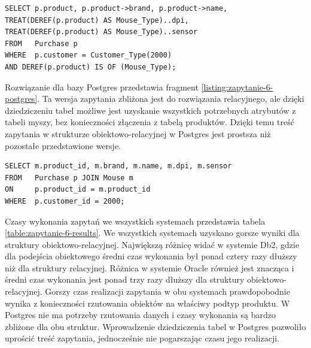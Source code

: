 \documentclass[a4paper,twoside,12pt]{book}
\begin{document}
\vspace{0.2cm}

\begin{lstlisting}[style=SQL, caption={Zapytanie szóste w Db2.}, label={listing:zapytanie-6-db2}, captionpos=b]
SELECT p.product, p.product->brand, p.product->name, 
TREAT(DEREF(p.product) AS Mouse_Type)..dpi,
TREAT(DEREF(p.product) AS Mouse_Type)..sensor
FROM   Purchase p
WHERE  p.customer = Customer_Type(2000) 
AND DEREF(p.product) IS OF (Mouse_Type);
\end{lstlisting}

\vspace{0.15cm}

Rozwiązanie dla bazy Postgres przedstawia fragment \ref{listing:zapytanie-6-postgres}. Ta wersja zapytania zbliżona jest do rozwiązania relacyjnego, ale dzięki dziedziczeniu tabel możliwe jest uzyskanie wszystkich potrzebnych atrybutów z tabeli myszy, bez konieczności złączenia z tabelą produktów. Dzięki temu treść zapytania w strukturze obiektowo-relacyjnej w Postgres jest prostsza niż pozostałe przedstawione wersje.

\vspace{0.2cm}

\begin{lstlisting}[style=SQL, caption={Zapytanie szóste w Postgres}, label={listing:zapytanie-6-postgres}, captionpos=b]
SELECT m.product_id, m.brand, m.name, m.dpi, m.sensor
FROM   Purchase p JOIN Mouse m 
ON     p.product_id = m.product_id
WHERE  p.customer_id = 2000;
\end{lstlisting}

Czasy wykonania zapytań we wszystkich systemach przedstawia tabela \ref{table:zapytanie-6-results}. We wszystkich systemach uzyskano gorsze wyniki dla struktury obiektowo-relacyjnej. Największą różnicę widać w systemie Db2, gdzie dla podejścia obiektowego średni czas wykonania był ponad cztery razy dłuższy niż dla struktury relacyjnej. Różnica w systemie Oracle również jest znacząca i średni czas wykonania jest ponad trzy razy dłuższy dla struktury obiektowo-relacyjnej. Gorszy czas realizacji zapytania w obu systemach prawdopobodnie wynika z konieczności rzutowania obiektów na właściwy podtyp produktu. W Postgres nie ma potrzeby rzutowania danych i czasy wykonania są bardzo zbliżone dla obu struktur. Wprowadzenie dziedziczenia tabel w Postgres pozwoliło uprościć treść zapytania, jednocześnie nie pogarszając czasu jego realizacji.
\end{document}
